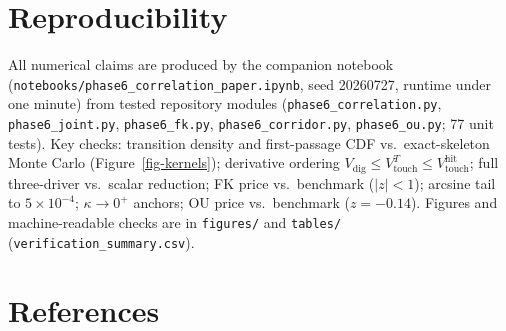 \documentclass[
  english,
  10pt,
  letterpaper,
  DIV=11,
  numbers=noendperiod]{scrartcl}
\theoremstyle{plain}
\theoremstyle{plain}
\theoremstyle{plain}
\theoremstyle{plain}
\theoremstyle{definition}
\theoremstyle{remark}
\begin{document}
\section*{Reproducibility}\label{sec-reproducibility}

All numerical claims are produced by the companion notebook
(\texttt{notebooks/phase6\_correlation\_paper.ipynb}, seed 20260727,
runtime under one minute) from tested repository modules
(\texttt{phase6\_correlation.py}, \texttt{phase6\_joint.py},
\texttt{phase6\_fk.py}, \texttt{phase6\_corridor.py},
\texttt{phase6\_ou.py}; 77 unit tests). Key checks: transition density
and first-passage CDF vs.~exact-skeleton Monte Carlo
(Figure~\ref{fig-kernels}); derivative ordering
\(V_{\mathrm{dig}}\le V_{\mathrm{touch}}^{T}\le
V_{\mathrm{touch}}^{\mathrm{hit}}\); full three-driver vs.~scalar
reduction; FK price vs.~benchmark (\(|z|<1\)); arcsine tail to
\(5\times10^{-4}\); \(\kappa\to0^{+}\) anchors; OU price vs.~benchmark
(\(z=-0.14\)). Figures and machine-readable checks are in
\texttt{figures/} and \texttt{tables/}
(\texttt{verification\_summary.csv}).

\section*{References}\label{references}
\end{document}
